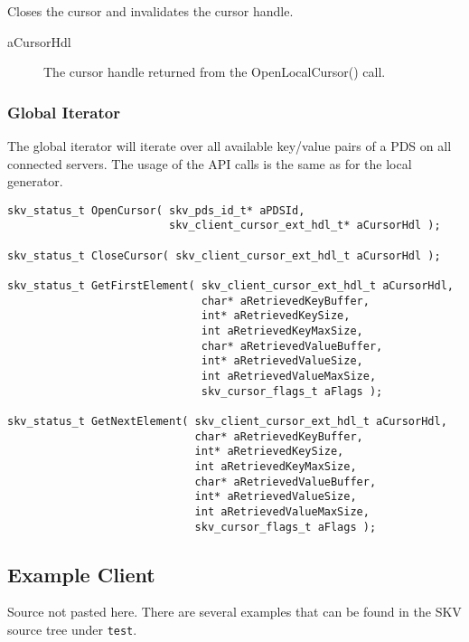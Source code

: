 Closes the cursor and invalidates the cursor handle.
\begin{description}
\item[aCursorHdl] The cursor handle returned from the
  OpenLocalCursor() call.
\end{description}

\subsubsection{Global Iterator}\label{sec:api:cursor_global}
The global iterator will iterate over all available key/value pairs of
a PDS on all connected servers.  The usage of the API calls is the
same as for the local generator.

\begin{lstlisting}
skv_status_t OpenCursor( skv_pds_id_t* aPDSId,
                         skv_client_cursor_ext_hdl_t* aCursorHdl );

skv_status_t CloseCursor( skv_client_cursor_ext_hdl_t aCursorHdl );

skv_status_t GetFirstElement( skv_client_cursor_ext_hdl_t aCursorHdl,
                              char* aRetrievedKeyBuffer,
                              int* aRetrievedKeySize,
                              int aRetrievedKeyMaxSize,
                              char* aRetrievedValueBuffer,
                              int* aRetrievedValueSize,
                              int aRetrievedValueMaxSize,
                              skv_cursor_flags_t aFlags );

skv_status_t GetNextElement( skv_client_cursor_ext_hdl_t aCursorHdl,
                             char* aRetrievedKeyBuffer,
                             int* aRetrievedKeySize,
                             int aRetrievedKeyMaxSize,
                             char* aRetrievedValueBuffer,
                             int* aRetrievedValueSize,
                             int aRetrievedValueMaxSize,
                             skv_cursor_flags_t aFlags );
\end{lstlisting}


\subsection{Example Client}\label{sec:api:example}
Source not pasted here.  There are several examples that can be found
in the SKV source tree under \verb|test|.

\endinput



